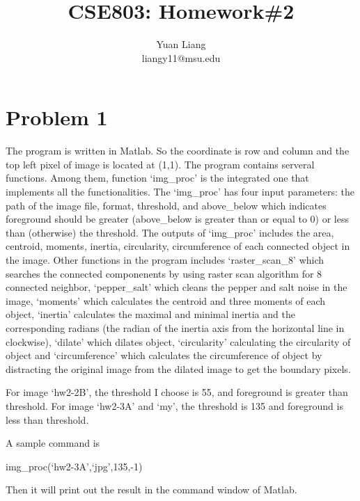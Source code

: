 \documentclass[a4paper]{article}
\begin{document}
\title{CSE803: Homework\#2}
\author{Yuan Liang\\liangy11@msu.edu}
\date{}
\maketitle
{}
\section{Problem 1}
The program is written in Matlab. So the coordinate is row and column and the top left pixel of image is located at (1,1). The program contains serveral functions. Among them, function `img\_proc' is the integrated one that implements all the functionalities. The `img\_proc' has four input parameters: the path of the image file, format, threshold, and above\_below which indicates foreground should be greater (above\_below is greater than or equal to 0) or less than (otherwise) the threshold. The outputs of `img\_proc' includes the area, centroid, moments, inertia, circularity, circumference of each connected object in the image. Other functions in the program includes `raster\_scan\_8' which searches the connected componenents by using raster scan algorithm for 8 connected neighbor, `pepper\_salt' which cleans the pepper and salt noise in the image, `moments' which calculates the centroid and three moments of each object, `inertia' calculates the maximal and minimal inertia and the corresponding radians (the radian of the inertia axis from the horizontal line in clockwise), `dilate' which dilates object, `circularity' calculating the circularity of object and `circumference' which calculates the circumference of object by distracting the original image from the dilated image to get the boundary pixels.

For image `hw2-2B', the threshold I choose is 55, and foreground is greater than threshold. For image `hw2-3A' and `my', the threshold is 135 and foreground is less than threshold.

A sample command is
\begin{center}
	img\_proc(`hw2-3A',`jpg',135,-1)
\end{center}
Then it will print out the result in the command window of Matlab.
\end{document}
